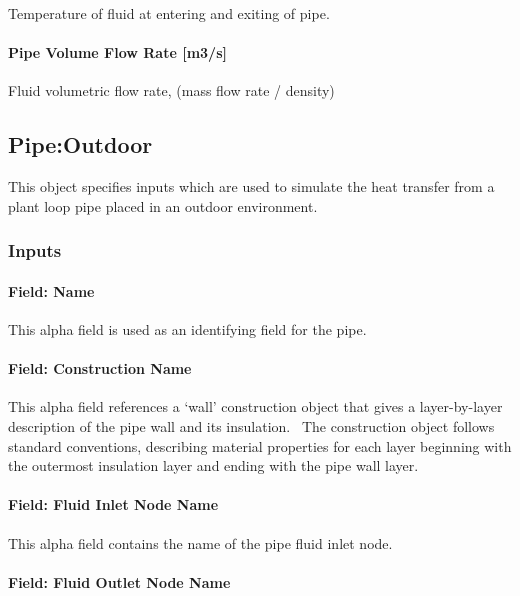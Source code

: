 Temperature of fluid at entering and exiting of pipe.

\paragraph{Pipe Volume Flow Rate {[}m3/s{]}}\label{pipe-volume-flow-rate-m3s}

Fluid volumetric flow rate, (mass flow rate / density)

\subsection{Pipe:Outdoor}\label{pipeoutdoor}

This object specifies inputs which are used to simulate the heat transfer from a plant loop pipe placed in an outdoor environment.

\subsubsection{Inputs}\label{inputs-7-014}

\paragraph{Field: Name}\label{field-name-7-010}

This alpha field is used as an identifying field for the pipe.

\paragraph{Field: Construction Name}\label{field-construction-name-1-000}

This alpha field references a `wall' construction object that gives a layer-by-layer description of the pipe wall and its insulation.~ The construction object follows standard conventions, describing material properties for each layer beginning with the outermost insulation layer and ending with the pipe wall layer.

\paragraph{Field: Fluid Inlet Node Name}\label{field-fluid-inlet-node-name-1-000}

This alpha field contains the name of the pipe fluid inlet node.

\paragraph{Field: Fluid Outlet Node Name}\label{field-fluid-outlet-node-name-1-000}

